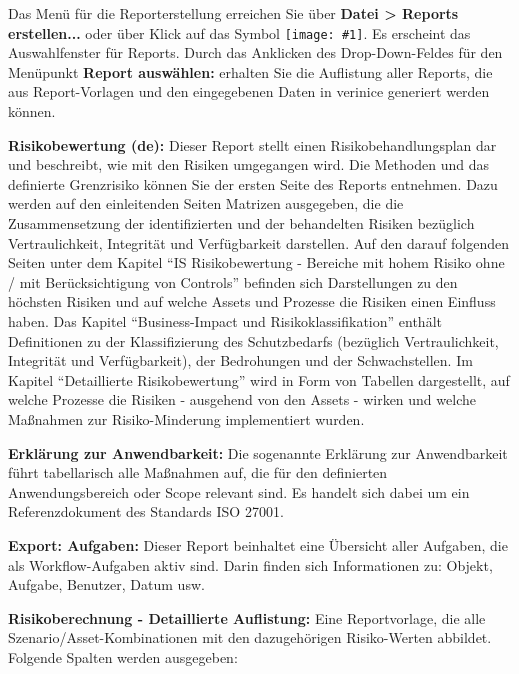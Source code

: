 \documentclass[a4paper,10pt]{book}
\newcommand{\icon}[1]{\texttt{[image: \#1]}}
\begin{document}
Das Menü für die Reporterstellung erreichen Sie über \textbf{Datei \textgreater
Reports erstellen...} oder über Klick auf das Symbol
\icon{Icon/Report.png}. Es erscheint das Auswahlfenster
für Reports. Durch das Anklicken des Drop-Down-Feldes für den Menüpunkt
\textbf{Report auswählen:} erhalten Sie die Auflistung aller Reports, die aus
Report-Vorlagen und den eingegebenen Daten in verinice generiert werden können.

\textbf{Risikobewertung (de):} Dieser Report stellt einen Risikobehandlungsplan
dar und beschreibt, wie mit den Risiken umgegangen wird. Die Methoden und das
definierte Grenzrisiko können Sie der ersten Seite des Reports entnehmen. Dazu
werden auf den einleitenden Seiten Matrizen ausgegeben, die die Zusammensetzung
der identifizierten und der behandelten Risiken bezüglich Vertraulichkeit,
Integrität und Verfügbarkeit darstellen. Auf den darauf folgenden Seiten unter
dem Kapitel ``IS Risikobewertung - Bereiche mit hohem Risiko ohne / mit
Berücksichtigung von Controls'' befinden sich Darstellungen zu den höchsten
Risiken und auf welche Assets und Prozesse die Risiken einen Einfluss haben. Das
Kapitel ``Business-Impact und Risikoklassifikation'' enthält Definitionen zu der
Klassifizierung des Schutzbedarfs (bezüglich Vertraulichkeit, Integrität und
Verfügbarkeit), der Bedrohungen und der Schwachstellen. Im Kapitel
``Detaillierte Risikobewertung'' wird in Form von Tabellen dargestellt, auf
welche Prozesse die Risiken - ausgehend von den Assets - wirken und welche
Maßnahmen zur Risiko-Minderung implementiert wurden.

\textbf{Erklärung zur Anwendbarkeit:} Die sogenannte Erklärung zur Anwendbarkeit
führt tabellarisch alle Maßnahmen auf, die für den definierten Anwendungsbereich
oder Scope relevant sind. Es handelt sich dabei um ein Referenzdokument des
Standards ISO 27001.


\textbf{Export: Aufgaben:} Dieser Report beinhaltet eine Übersicht aller
Aufgaben, die als Workflow-Aufgaben aktiv sind. Darin finden sich Informationen
zu: Objekt, Aufgabe, Benutzer, Datum usw.

\textbf{Risikoberechnung - Detaillierte Auflistung:} Eine Reportvorlage, die
alle Szenario/Asset-Kombinationen mit den dazugehörigen Risiko-Werten abbildet.
Folgende Spalten werden ausgegeben:
\end{document}
